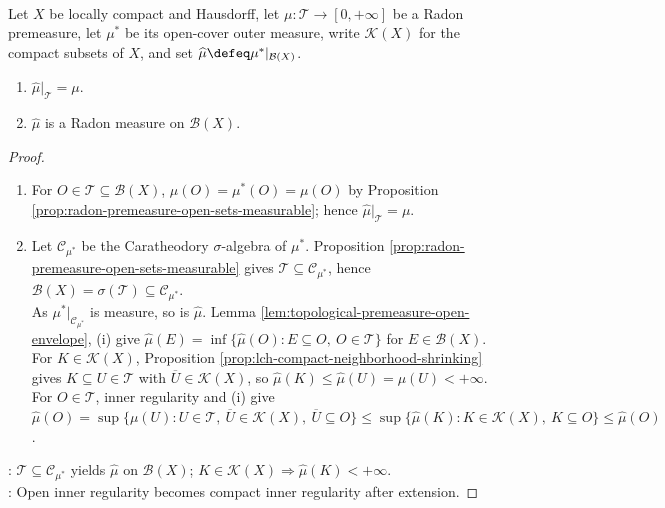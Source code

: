 \begin{theorem} \label{thm:radon-premeasure-caratheodory-extension} \\
Let $X$ be locally compact and Hausdorff, let $\mu:\mathcal{T}\to[0,+\infty]$ be a Radon premeasure, let $\mu^\ast$ be its open-cover outer measure, write $\mathcal{K}(X)$ for the compact subsets of $X$, and set $\widehat{\mu}\defeq\mu^\ast|_{\mathcal{B}(X)}$.
\begin{enumerate}[label=(\roman*)]
\setlength{\itemsep}{0pt}
\item $\widehat{\mu}|_{\mathcal{T}}=\mu$.
\item $\widehat{\mu}$ is a Radon measure on $\mathcal{B}(X)$.
\end{enumerate}
\begin{proof}
\begin{enumerate}[label=(\roman*)]
\setlength{\itemsep}{0pt}
\item[(i)] For $O\in\mathcal{T}\subseteq\mathcal{B}(X)$, $\widehat{\mu}(O)=\mu^\ast(O)=\mu(O)$ by Proposition \ref{prop:radon-premeasure-open-sets-measurable}; hence $\widehat{\mu}|_{\mathcal{T}}=\mu$.
\item[(ii)] Let $\mathcal{C}_{\mu^\ast}$ be the Caratheodory $\sigma$-algebra of $\mu^\ast$. Proposition \ref{prop:radon-premeasure-open-sets-measurable} gives $\mathcal{T}\subseteq\mathcal{C}_{\mu^\ast}$, hence $\mathcal{B}(X)=\sigma(\mathcal{T})\subseteq\mathcal{C}_{\mu^\ast}$.\\
As $\mu^\ast|_{\mathcal{C}_{\mu^\ast}}$ is measure, so is $\widehat{\mu}$. Lemma \ref{lem:topological-premeasure-open-envelope}, (i) give $\widehat{\mu}(E)=\inf\{\widehat{\mu}(O):E\subseteq O,\ O\in\mathcal{T}\}$ for $E\in\mathcal{B}(X)$.\\
For $K\in\mathcal{K}(X)$, Proposition \ref{prop:lch-compact-neighborhood-shrinking} gives $K\subseteq U\in\mathcal{T}$ with $\overline{U}\in\mathcal{K}(X)$, so $\widehat{\mu}(K)\leq\widehat{\mu}(U)=\mu(U)<+\infty$.\\
For $O\in\mathcal{T}$, inner regularity and (i) give\\
$\widehat{\mu}(O)=\sup\{\mu(U):U\in\mathcal{T},\ \overline{U}\in\mathcal{K}(X),\ \overline{U}\subseteq O\}\leq\sup\{\widehat{\mu}(K):K\in\mathcal{K}(X),\ K\subseteq O\}\leq\widehat{\mu}(O)$.
\end{enumerate}
: $\mathcal{T}\subseteq\mathcal{C}_{\mu^\ast}$ yields $\widehat{\mu}$ on $\mathcal{B}(X)$; $K\in\mathcal{K}(X)\Rightarrow\widehat{\mu}(K)<+\infty$.\\
: Open inner regularity becomes compact inner regularity after extension.
\end{proof}
\end{theorem}

